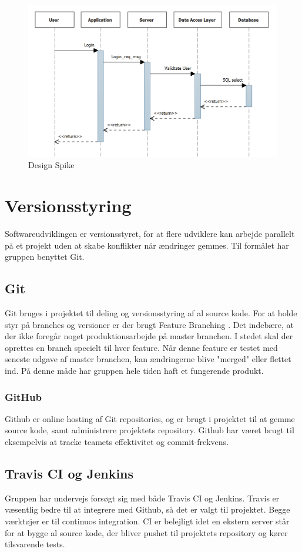 \begin{figure}
	\centering
	\includegraphics[width=0.8\linewidth]{figs/processProjektGennemforsel/Spike.PNG}
	\caption{Design Spike}
	\label{fig:design_spike}
\end{figure}

\section{Versionsstyring}
Softwareudviklingen er versionsstyret, for at flere udviklere kan arbejde parallelt på et projekt uden at skabe konflikter når ændringer gemmes. Til formålet har gruppen benyttet Git.

\subsection{Git}
Git bruges i projektet til deling og versionsstyring af al source kode.
For at holde styr på branches og versioner er der brugt Feature Branching \cite{atlassian2016}. Det indebære, at der ikke foregår noget produktionsarbejde på master branchen. I stedet skal der oprettes en branch specielt til hver feature. Når denne feature er testet med seneste udgave af master branchen, kan ændringerne blive "merged" eller flettet ind. På denne måde har gruppen hele tiden haft et fungerende produkt.

\subsubsection{GitHub}
Github er online hosting af Git repositories, og er brugt i projektet til at gemme source kode, samt administrere projektets repository. Github har været brugt til eksempelvis at tracke teamets effektivitet og commit-frekvens.

\subsection{Travis CI og Jenkins} 
Gruppen har undervejs forsøgt sig med både Travis CI og Jenkins. Travis er væsentlig bedre til at integrere med Github, så det er valgt til projektet.
Begge værktøjer er til continuos integration. CI er belejligt idet en ekstern server står for at bygge al source kode, der bliver pushet til projektets repository og kører tilsvarende tests.

